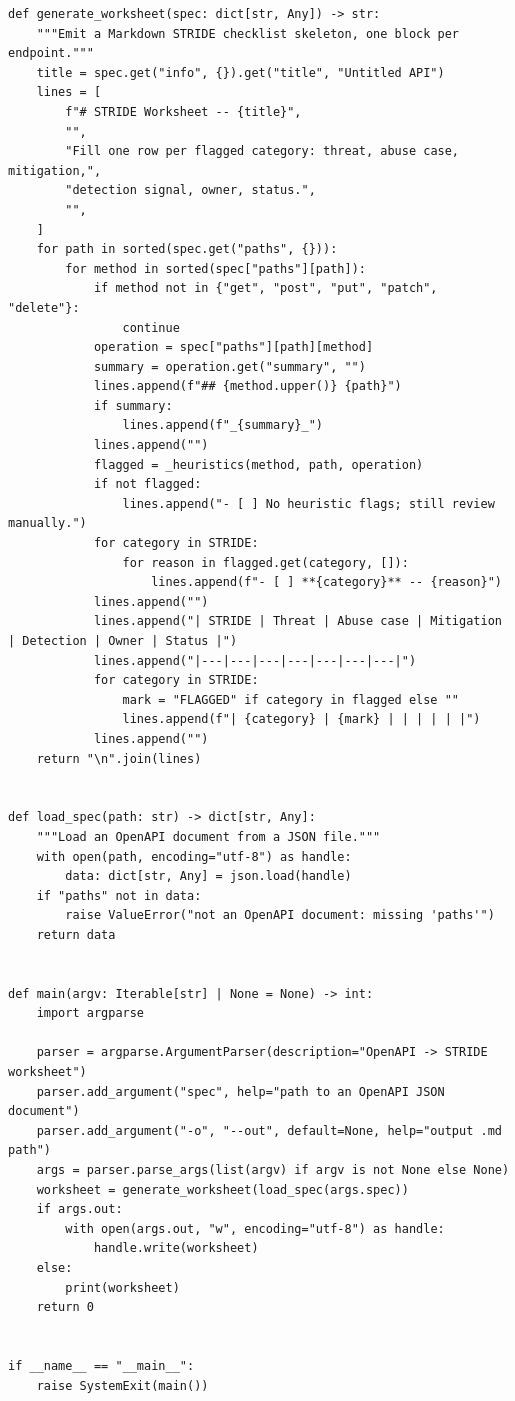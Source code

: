 \begin{verbatim}
def generate_worksheet(spec: dict[str, Any]) -> str:
    """Emit a Markdown STRIDE checklist skeleton, one block per endpoint."""
    title = spec.get("info", {}).get("title", "Untitled API")
    lines = [
        f"# STRIDE Worksheet -- {title}",
        "",
        "Fill one row per flagged category: threat, abuse case, mitigation,",
        "detection signal, owner, status.",
        "",
    ]
    for path in sorted(spec.get("paths", {})):
        for method in sorted(spec["paths"][path]):
            if method not in {"get", "post", "put", "patch", "delete"}:
                continue
            operation = spec["paths"][path][method]
            summary = operation.get("summary", "")
            lines.append(f"## {method.upper()} {path}")
            if summary:
                lines.append(f"_{summary}_")
            lines.append("")
            flagged = _heuristics(method, path, operation)
            if not flagged:
                lines.append("- [ ] No heuristic flags; still review manually.")
            for category in STRIDE:
                for reason in flagged.get(category, []):
                    lines.append(f"- [ ] **{category}** -- {reason}")
            lines.append("")
            lines.append("| STRIDE | Threat | Abuse case | Mitigation | Detection | Owner | Status |")
            lines.append("|---|---|---|---|---|---|---|")
            for category in STRIDE:
                mark = "FLAGGED" if category in flagged else ""
                lines.append(f"| {category} | {mark} | | | | | |")
            lines.append("")
    return "\n".join(lines)


def load_spec(path: str) -> dict[str, Any]:
    """Load an OpenAPI document from a JSON file."""
    with open(path, encoding="utf-8") as handle:
        data: dict[str, Any] = json.load(handle)
    if "paths" not in data:
        raise ValueError("not an OpenAPI document: missing 'paths'")
    return data


def main(argv: Iterable[str] | None = None) -> int:
    import argparse

    parser = argparse.ArgumentParser(description="OpenAPI -> STRIDE worksheet")
    parser.add_argument("spec", help="path to an OpenAPI JSON document")
    parser.add_argument("-o", "--out", default=None, help="output .md path")
    args = parser.parse_args(list(argv) if argv is not None else None)
    worksheet = generate_worksheet(load_spec(args.spec))
    if args.out:
        with open(args.out, "w", encoding="utf-8") as handle:
            handle.write(worksheet)
    else:
        print(worksheet)
    return 0


if __name__ == "__main__":
    raise SystemExit(main())
\end{verbatim}

